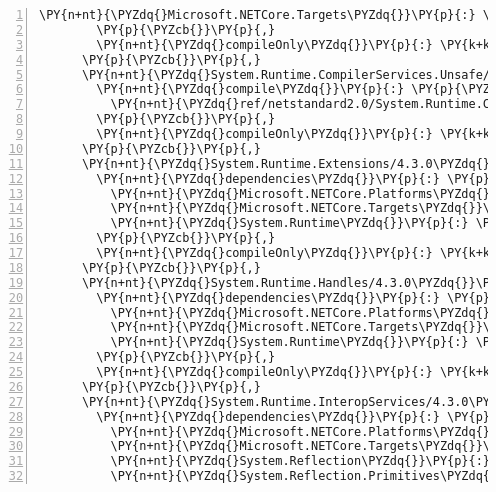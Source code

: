 \begin{Verbatim}[commandchars=\\\{\},numbers=left,firstnumber=1,stepnumber=1,numberblanklines=0]
          \PY{n+nt}{\PYZdq{}Microsoft.NETCore.Targets\PYZdq{}}\PY{p}{:} \PY{l+s+s2}{\PYZdq{}2.1.0\PYZhy{}rc1\PYZdq{}}
        \PY{p}{\PYZcb{}}\PY{p}{,}
        \PY{n+nt}{\PYZdq{}compileOnly\PYZdq{}}\PY{p}{:} \PY{k+kc}{true}
      \PY{p}{\PYZcb{}}\PY{p}{,}
      \PY{n+nt}{\PYZdq{}System.Runtime.CompilerServices.Unsafe/4.5.0\PYZhy{}rc1\PYZdq{}}\PY{p}{:} \PY{p}{\PYZob{}}
        \PY{n+nt}{\PYZdq{}compile\PYZdq{}}\PY{p}{:} \PY{p}{\PYZob{}}
          \PY{n+nt}{\PYZdq{}ref/netstandard2.0/System.Runtime.CompilerServices.Unsafe.dll\PYZdq{}}\PY{p}{:} \PY{p}{\PYZob{}}\PY{p}{\PYZcb{}}
        \PY{p}{\PYZcb{}}\PY{p}{,}
        \PY{n+nt}{\PYZdq{}compileOnly\PYZdq{}}\PY{p}{:} \PY{k+kc}{true}
      \PY{p}{\PYZcb{}}\PY{p}{,}
      \PY{n+nt}{\PYZdq{}System.Runtime.Extensions/4.3.0\PYZdq{}}\PY{p}{:} \PY{p}{\PYZob{}}
        \PY{n+nt}{\PYZdq{}dependencies\PYZdq{}}\PY{p}{:} \PY{p}{\PYZob{}}
          \PY{n+nt}{\PYZdq{}Microsoft.NETCore.Platforms\PYZdq{}}\PY{p}{:} \PY{l+s+s2}{\PYZdq{}2.1.0\PYZhy{}rc1\PYZdq{}}\PY{p}{,}
          \PY{n+nt}{\PYZdq{}Microsoft.NETCore.Targets\PYZdq{}}\PY{p}{:} \PY{l+s+s2}{\PYZdq{}2.1.0\PYZhy{}rc1\PYZdq{}}\PY{p}{,}
          \PY{n+nt}{\PYZdq{}System.Runtime\PYZdq{}}\PY{p}{:} \PY{l+s+s2}{\PYZdq{}4.3.0\PYZdq{}}
        \PY{p}{\PYZcb{}}\PY{p}{,}
        \PY{n+nt}{\PYZdq{}compileOnly\PYZdq{}}\PY{p}{:} \PY{k+kc}{true}
      \PY{p}{\PYZcb{}}\PY{p}{,}
      \PY{n+nt}{\PYZdq{}System.Runtime.Handles/4.3.0\PYZdq{}}\PY{p}{:} \PY{p}{\PYZob{}}
        \PY{n+nt}{\PYZdq{}dependencies\PYZdq{}}\PY{p}{:} \PY{p}{\PYZob{}}
          \PY{n+nt}{\PYZdq{}Microsoft.NETCore.Platforms\PYZdq{}}\PY{p}{:} \PY{l+s+s2}{\PYZdq{}2.1.0\PYZhy{}rc1\PYZdq{}}\PY{p}{,}
          \PY{n+nt}{\PYZdq{}Microsoft.NETCore.Targets\PYZdq{}}\PY{p}{:} \PY{l+s+s2}{\PYZdq{}2.1.0\PYZhy{}rc1\PYZdq{}}\PY{p}{,}
          \PY{n+nt}{\PYZdq{}System.Runtime\PYZdq{}}\PY{p}{:} \PY{l+s+s2}{\PYZdq{}4.3.0\PYZdq{}}
        \PY{p}{\PYZcb{}}\PY{p}{,}
        \PY{n+nt}{\PYZdq{}compileOnly\PYZdq{}}\PY{p}{:} \PY{k+kc}{true}
      \PY{p}{\PYZcb{}}\PY{p}{,}
      \PY{n+nt}{\PYZdq{}System.Runtime.InteropServices/4.3.0\PYZdq{}}\PY{p}{:} \PY{p}{\PYZob{}}
        \PY{n+nt}{\PYZdq{}dependencies\PYZdq{}}\PY{p}{:} \PY{p}{\PYZob{}}
          \PY{n+nt}{\PYZdq{}Microsoft.NETCore.Platforms\PYZdq{}}\PY{p}{:} \PY{l+s+s2}{\PYZdq{}2.1.0\PYZhy{}rc1\PYZdq{}}\PY{p}{,}
          \PY{n+nt}{\PYZdq{}Microsoft.NETCore.Targets\PYZdq{}}\PY{p}{:} \PY{l+s+s2}{\PYZdq{}2.1.0\PYZhy{}rc1\PYZdq{}}\PY{p}{,}
          \PY{n+nt}{\PYZdq{}System.Reflection\PYZdq{}}\PY{p}{:} \PY{l+s+s2}{\PYZdq{}4.3.0\PYZdq{}}\PY{p}{,}
          \PY{n+nt}{\PYZdq{}System.Reflection.Primitives\PYZdq{}}\PY{p}{:} \PY{l+s+s2}{\PYZdq{}4.3.0\PYZdq{}}\PY{p}{,}

\end{Verbatim}
